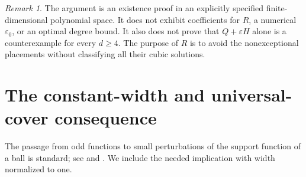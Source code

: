 \documentclass[11pt,reqno]{amsart}
\theoremstyle{definition}
\theoremstyle{remark}
\newtheorem{remark}[remark]{Remark}
\numberwithin{equation}{section}
\newcommand{\eps}{\varepsilon}
\begin{document}
\begin{remark}\label{rem:scope}
The argument is an existence proof in an explicitly specified
finite-dimensional polynomial space. It does not exhibit coefficients
for $R$, a numerical $\eps_0$, or an optimal degree bound. It also
does not prove that $Q+\eps H$ alone is a counterexample for every
$d\geq4$. The purpose of $R$ is to avoid the nonexceptional
placements without classifying all their cubic solutions.
\end{remark}

\section{The constant-width and universal-cover consequence}
\label{sec:geometry}

The passage from odd functions to small perturbations of the support
function of a ball is standard; see
\cite[Section I, Proposition 1]{Kuperberg1999} and
\cite[Lemma 8]{Chen2026}. We include the needed implication with
width normalized to one.
\end{document}
